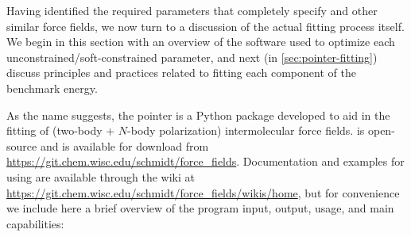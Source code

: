 Having identified the required parameters that completely specify \mastiff
and other similar force fields, we now turn to a discussion of the actual
fitting process itself. We begin in this section with an overview of the
software used to optimize each unconstrained/soft-constrained parameter, and
next (in \cref{sec:pointer-fitting}) discuss principles and practices
related to fitting each component of the benchmark \sapt energy.

As the name suggests, the \acrfull{pointer} is a Python package developed to aid in the fitting of
(two-body + $N$-body polarization) intermolecular force fields. \pointer is
open-source and is available for download from
\url{https://git.chem.wisc.edu/schmidt/force_fields}.
Documentation and examples for using \pointer are available through the wiki at
\url{https://git.chem.wisc.edu/schmidt/force_fields/wikis/home}, but for
convenience we include here a brief overview of the program input, output, usage, and
main capabilities:


